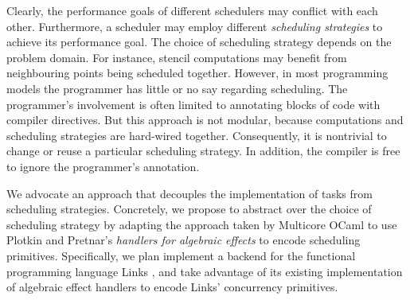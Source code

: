 \documentclass[preprint,10pt,numbers]{sigplanconf}
\begin{document}
Clearly, the performance goals of different schedulers may conflict with each other. Furthermore, a scheduler may employ different \emph{scheduling strategies} to achieve its performance goal. The choice of scheduling strategy depends on the problem domain.
For instance, stencil computations may benefit from neighbouring points being scheduled together.
However, in most programming models the programmer has little or no say regarding scheduling. The programmer's involvement is often limited to annotating blocks of code with compiler directives. But this approach is not modular, because computations and scheduling strategies are hard-wired together. Consequently, it is nontrivial to change or reuse a particular scheduling strategy. In addition, the compiler is free to ignore the programmer's annotation.



We advocate an approach that decouples the implementation of tasks from scheduling strategies.
Concretely, we propose to abstract over the choice of scheduling strategy by adapting the approach taken by Multicore OCaml \cite{Dolan2015} to use Plotkin and Pretnar's \emph{handlers for algebraic effects} \cite{Plotkin2013} to encode scheduling primitives. Specifically, we plan implement a backend for the functional programming language Links \cite{Cooper2006}, and take advantage of its existing implementation of algebraic effect handlers \cite{Hillerstrom2015} to encode Links' concurrency primitives.
\end{document}
